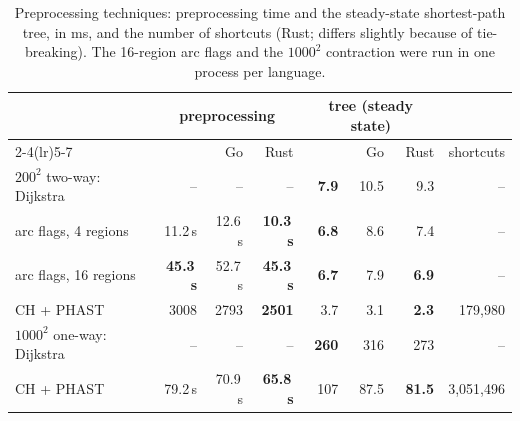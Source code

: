 \begin{table}[t]
\centering
\caption{Preprocessing techniques: preprocessing time and the steady-state shortest-path tree, in ms, and the number of shortcuts (Rust; \cs{} differs slightly because of tie-breaking). The 16-region arc flags and the $1000^2$ contraction were run in one process per language.}
\label{tab:ch}
\small
\begin{tabular}{lrrrrrrr}
\toprule
 & \multicolumn{3}{c}{preprocessing} & \multicolumn{3}{c}{tree (steady state)} \\ \cmidrule(lr){2-4}\cmidrule(lr){5-7}
 & \cs{} & Go & Rust & \cs{} & Go & Rust & shortcuts \\
\midrule
$200^2$ two-way: Dijkstra & -- & -- & -- & \textbf{7.9} & 10.5 & 9.3 & -- \\
\quad arc flags, 4 regions & \num{11.2}\,s & \num{12.6}\,s & \textbf{\num{10.3}\,s} & \textbf{6.8} & 8.6 & 7.4 & -- \\
\quad arc flags, 16 regions & \textbf{\num{45.3}\,s} & \num{52.7}\,s & \textbf{\num{45.3}\,s} & \textbf{6.7} & 7.9 & \textbf{6.9} & -- \\
\quad CH + PHAST & \num{3008} & \num{2793} & \textbf{\num{2501}} & 3.7 & 3.1 & \textbf{2.3} & 179{,}980 \\
\midrule
$1000^2$ one-way: Dijkstra & -- & -- & -- & \textbf{\num{260}} & \num{316} & \num{273} & -- \\
\quad CH + PHAST & \num{79.2}\,s & \num{70.9}\,s & \textbf{\num{65.8}\,s} & \num{107} & 87.5 & \textbf{81.5} & 3{,}051{,}496 \\
\bottomrule
\end{tabular}
\end{table}
